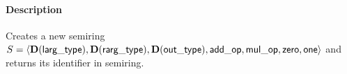 \paragraph{Description}

Creates a new semiring $S = \langle \bold{D}({\sf larg\_type}), \bold{D}({\sf rarg\_type}), 
\bold{D}({\sf out\_type}), {\sf add\_op}, {\sf mul\_op}, {\sf zero}, {\sf one} \rangle$ and 
returns its identifier in {\sf semiring}.

